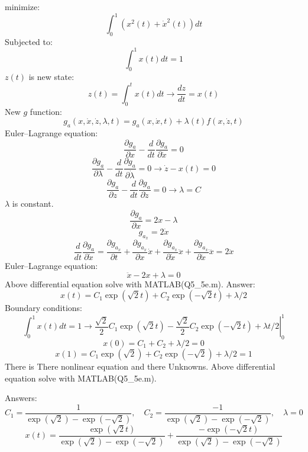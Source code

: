 minimize:
$$\int_0^1( x^2(t)+\dot x^2(t))dt$$
Subjected to:
$$\int_0^1 x(t)dt = 1$$
$z(t)$ is new state:
$$z(t) = \int_{0}^{t} x(t)dt \to \dfrac{dz}{dt} = x(t) $$
New $g$ function:
$$g_a(x, \dot x, \dot z, \lambda, t) = g_a(x, \dot x, t) + \lambda(t)f(x, \dot z, t) $$
Euler–Lagrange equation:
$$\dfrac{\partial g_a}{\partial x} - \dfrac{d}{dt}\dfrac{\partial g_a}{\partial \dot x} = 0$$
$$\dfrac{\partial g_a}{\partial \lambda} - \dfrac{d}{dt}\dfrac{\partial g_a}{\partial \dot \lambda} = 0 \to 
\dot z - x(t) = 0
$$
$$\dfrac{\partial g_a}{\partial z} - \dfrac{d}{dt}\dfrac{\partial g_a}{\partial \dot z} = 0 \to \lambda = C$$
$\lambda$ is constant.
$$\dfrac{\partial g_a}{\partial x} =  2x - \lambda$$
$$g_{a_{\dot{x}}} = 2 \dot x$$
$$\dfrac{d}{dt}\dfrac{\partial g_a}{\partial \dot x} = \dfrac{\partial g_{a_{\dot{x}}}}{\partial  t}+
\dfrac{\partial g_{a_{\dot{x}}}}{\partial  x}\dot x+
\dfrac{\partial g_{a_{\dot{x}}}}{\partial \dot x}\ddot x+
\dfrac{\partial g_{a_{\dot{x}}}}{\partial \ddot x} \dddot x
= 2\ddot x
$$
Euler–Lagrange equation:
$$
\ddot x -2x+\lambda = 0
$$
Above differential equation solve with MATLAB(Q5\_5e.m).
Answer:
$$ x(t) = C_1\exp(\sqrt{2}t) + C_2\exp(-\sqrt{2}t) + \lambda/2 $$
Boundary conditions:
$$\int_0^1 x(t)dt = 1 \to \left.\dfrac{\sqrt{2}}{2}C_1\exp(\sqrt{2}t) -
\dfrac{\sqrt{2}}{2} C_2\exp(-\sqrt{2}t) + \lambda t/2 \right\vert_0^1$$
$$x (0) = C_1+C_2+\lambda/2 = 0$$
$$ x(1) = C_1\exp(\sqrt{2}) + C_2\exp(-\sqrt{2}) + \lambda/2 = 1 $$
There is There nonlinear equation and there Unknowns. Above differential equation solve with MATLAB(Q5\_5e.m).


Answers:
$$C_1 = \dfrac{1}{\exp(\sqrt{2}) - \exp(-\sqrt{2})}, \quad C_2 = \dfrac{-1}{\exp(\sqrt{2}) - \exp(-\sqrt{2})}, \quad \lambda = 0$$
$$ x(t) = \dfrac{\exp(\sqrt{2}t)}{\exp(\sqrt{2}) - \exp(-\sqrt{2})}
+  \dfrac{-\exp(-\sqrt{2}t)}{\exp(\sqrt{2}) - \exp(-\sqrt{2})} $$
